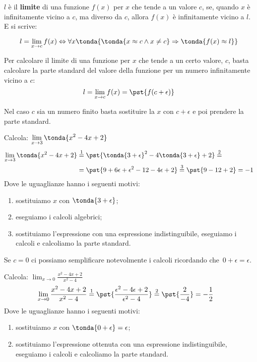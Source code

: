 \begin{definizione}
\(l\) è il \textbf{limite} di una funzione \(f(x)\) per \(x\) 
che tende a un 
valore \(c\), se, quando \(x\) è infinitamente vicino a \(c\), 
ma diverso da \(c\), 
allora \(f(x)\) è infinitamente vicino a \(l\). E si scrive:

\[l=\lim_{x \rightarrow c} f(x) \Leftrightarrow 
\forall x \tonda{\tonda{x \approx c \wedge x \neq c} \Rightarrow 
\tonda{f(x) \approx l}}\]
\end{definizione}

Per calcolare il limite di una funzione per \(x\) che tende a un certo 
valore, \(c\), basta calcolare la parte standard del valore della funzione 
per un numero infinitamente vicino a \(c\):
\[l=\lim_{x \rightarrow c} f(x) = \pst{f(c+\epsilon)}\]

Nel caso \(c\) sia un numero finito basta sostituire la \(x\) con \(c+\epsilon\) 
e poi prendere la parte standard.

\begin{esempio}
Calcola: \quad \(\displaystyle \lim_{x \rightarrow 3} \tonda{x^2-4x+2}\)
\begin{align*}
\lim_{x \rightarrow 3} \tonda{x^2-4x+2} & \stackrel{1}{=} 
  \pst{\tonda{3+\epsilon}^2-4\tonda{3+\epsilon}+2} \stackrel{2}{=}\\  
  & =\pst{9 + 6 \epsilon + \epsilon^2 - 12 - 4\epsilon + 2} \stackrel{3}{=}
  \pst{9 - 12 + 2} = -1
\end{align*}
Dove le uguaglianze hanno i seguenti motivi:
\begin{enumerate} [nosep]
 \item sostituiamo \(x\) con \(\tonda{3+\epsilon}\);
 \item eseguiamo i calcoli algebrici;
 \item sostituiamo l'espressione con una espressione indistinguibile,
   eseguiamo i calcoli e calcoliamo la parte standard.
\end{enumerate}
\end{esempio}

Se \(c=0\) ci possiamo semplificare notevolmente i calcoli ricordando 
che~\(0 + \epsilon = \epsilon\).

\begin{esempio}
Calcola: \quad 
  \(\displaystyle \lim_{x \rightarrow 0} \frac{x^2-4x+2}{x^2-4}\)
\begin{align*}
\lim_{x \rightarrow 0} \frac{x^2-4x+2}{x^2-4} & \stackrel{1}{=} 
  \pst{\frac{\epsilon^2-4\epsilon+2}{\epsilon^2-4}} \stackrel{2}{=}  
  \pst{\frac{2}{-4}} = -\frac{1}{2}
\end{align*}
Dove le uguaglianze hanno i seguenti motivi:
\begin{enumerate} [nosep]
 \item sostituiamo \(x\) con \(\tonda{0+\epsilon}=\epsilon\);
 \item sostituiamo l'espressione ottenuta con una espressione 
   indistinguibile, eseguiamo i calcoli e calcoliamo la parte standard.
\end{enumerate}
\end{esempio}

